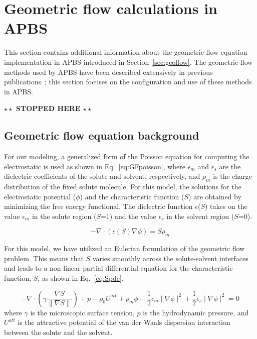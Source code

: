\documentclass[12pt,titlepage]{article}
\newcommand{\todo}[1]{\textbf{$\star \star$ {#1} $\star \star$}}
\begin{document}
\section{Geometric flow calculations in APBS} \label{app:geoflow}
This section contains additional information about the geometric flow equation implementation in APBS introduced in Section~\ref{sec:geoflow}.
The geometric flow methods used by APBS have been described extensively in previous publications~\cite{Chen2010, Chen2011, Chen2012, Daily2013, Thomas2013a}; this section focuses on the configuration and use of these methods in APBS.

\todo{STOPPED HERE}

\subsection{Geometric flow equation background}
For our modeling, a generalized form of the Poisson equation for computing the electrostatic is used as shown in Eq.~\ref{eq:GFpoisson}, where $\epsilon_m$ and $\epsilon_s$ are the dielectric coefficients of the solute and solvent, respectively, and $\rho_m$ is the charge distribution of the fixed solute molecule. For this model, the solutions for the electrostatic potential ($\phi$) and the characteristic function ($S$) are obtained by minimizing the free energy functional. The dielectric function $\epsilon$($S$) takes on the value $\epsilon_m$ in the solute region ($S$=1) and the value $\epsilon_s$ in the solvent region ($S$=0).

\begin{equation}\label{eq:GFpoisson}
-\nabla \cdot\left(\epsilon\left(S\right)\nabla\phi\right)=S\rho_m
\end{equation}

For this model, we have utilized an Eulerian formulation of the geometric flow problem. This means that $S$ varies smoothly across the solute-solvent interfaces and leads to a non-linear partial differential equation for the characteristic function, $S$, as shown in Eq.~\ref{eq:Spde}.

\begin{equation}\label{eq:Spde}
-\nabla\cdot\left(\gamma\frac{\nabla S}{\parallel\nabla S\parallel}\right)+p-\rho_0U^{att}+\rho_m\phi - \frac{1}{2}\epsilon_m\mid\nabla\phi\mid^2+\frac{1}{2}\epsilon_s\mid\nabla\phi\mid^2=0
\end{equation}
where $\gamma$ is the microscopic surface tension, $p$ is the hydrodynamic pressure, and $U^{att}$ is the attractive potential of the van der Waals dispersion interaction between the solute and the solvent.
\end{document}
